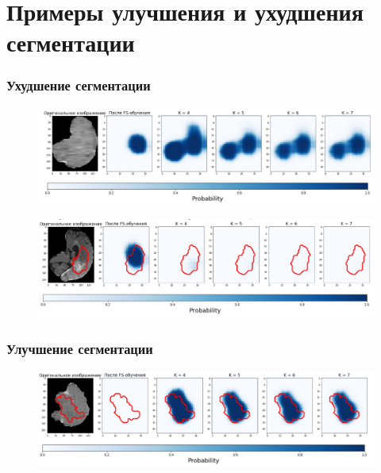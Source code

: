 \chapter{Примеры улучшения и ухудшения сегментации} \label{AppendixA}

\subsection{Ухудшение сегментации}

\begin{figure}[h!] 
  \center
  \includegraphics [scale=0.7] {images/bad_1.png}
\end{figure}

\begin{figure}[h!] 
  \center
  \includegraphics [scale=0.7] {images/bad_2.png}
\end{figure}



\newpage
\subsection{Улучшение сегментации}

\begin{figure}[h!] 
  \center
  \includegraphics [scale=0.7] {images/good_1.png}
\end{figure}



